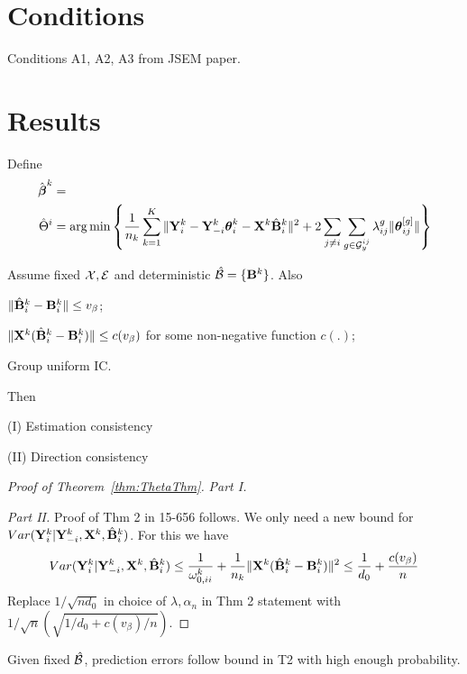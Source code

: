 \documentclass[fleqn,11pt]{article}
\DeclareMathOperator*{\argmin}{arg\,min}
\numberwithin{equation}{section}
\begin{document}
\section{Conditions}
Conditions A1, A2, A3 from JSEM paper.

\section{Results}
Define
%
\begin{align}
\hat \bfbeta^k &= \\
\hat \Theta^i &= \argmin \left\{ \frac{1}{n_k} \sum_{k=1}^K \| \bfY^k_i - \bfY_{-i}^k \bftheta_i^k - \bfX^k \hat \bfB_i^k \|^2 + 2 \sum_{j \neq i} \sum_{g \in \cG_y^{ij}} \lambda_{ij}^g \| \bftheta_{ij}^{[g]} \| \right\}
\end{align}

\begin{Theorem}\label{thm:ThetaThm}
Assume fixed ${\cal{X}}, {\cal{E}}$ and deterministic $\hat {{\cal{B}}} = \{ {\mathbf{B}}^k \}$. Also

 $\| \hat {{\mathbf{B}}}_i^k - {\mathbf{B}}_i^k \| \leq v_\beta$;

 $\| {\mathbf{X}}^k (\hat {{\mathbf{B}}}_i^k - {\mathbf{B}}_i^k ) \| \leq c(v_\beta)$ for some non-negative function $c(.)$;

Group uniform IC.

Then

\noindent (I) Estimation consistency

\noindent (II) Direction consistency 
\end{Theorem}

\begin{proof}[Proof of Theorem~\ref{thm:ThetaThm}]


\textit{Part I.}

\textit{Part II.} Proof of Thm 2 in 15-656 follows. We only need a new bound for $Var ({\mathbf{Y}}_i^k | {\mathbf{Y}}_{-i}^k, {\mathbf{X}}^k, \hat {{\mathbf{B}}}_i^k)$. For this we have
%
$$
Var ({\mathbf{Y}}_i^k | {\mathbf{Y}}_{-i}^k, {\mathbf{X}}^k, \hat {{\mathbf{B}}}_i^k) \leq \frac{1}{\omega_{0,ii}^k} + \frac{1}{n_k} \| {\mathbf{X}}^k (\hat {{\mathbf{B}}}_i^k - {\mathbf{B}}_i^k) \|^2 \leq \frac{1}{d_0} + \frac{c(v_\beta)}{n}
$$
%
Replace $1/\sqrt{n d_0}$ in choice of $\lambda, \alpha_n$ in Thm 2 statement with $1/\sqrt{n} (\sqrt{1/d_0 + c(v_\beta)/ n})$.

\end{proof}

\begin{Proposition}
Given fixed $\hat {{\cal{B}}}$, prediction errors follow bound in T2 with high enough probability.
\end{Proposition}


%

\end{document}
